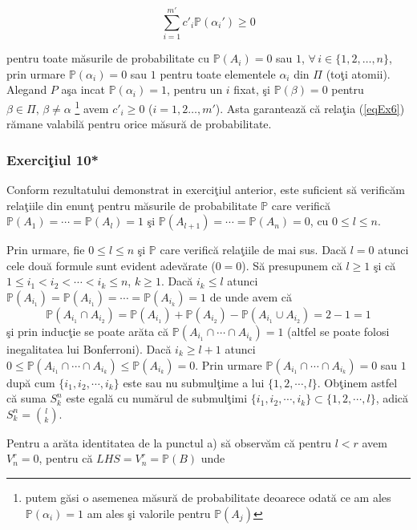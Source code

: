 \documentclass[]{article}
\def\a{{\alpha}}
\def\b{{\beta}}
\def\PP{{\mathbb P}}
\let\rmarkdownfootnote\footnote%
\def\footnote{\protect\rmarkdownfootnote}
\begin{document}
\begin{equation}\label{eqEx6}
  \sum_{i=1}^{m'}c'_{i}\PP(\a_i')\geq 0 
\end{equation}

pentru toate m\u asurile de probabilitate cu \(\PP(A_i)=0\) sau \(1\),
\(\forall\, i\in\{1,2,\dots,n\}\), prin urmare \(\PP(\a_i)=0\) sau \(1\)
pentru toate elementele \(\a_i\) din \(\Pi\) (to\c ti atomii). Alegand
\(P\) a\c sa incat \(\PP(\a_i)=1\), pentru un \(i\) fixat, \c si
\(\PP(\b)=0\) pentru \(\b\in\Pi, \, \b\neq\a\) \footnote{putem g\u asi o
  asemenea m\u asur\u a de probabilitate deoarece odat\u a ce am ales
  \(\PP(\a_i)=1\) am ales \c si valorile pentru \(\PP(A_j)\)} avem
\(c'_i\geq 0\) (\(i=1,2\dots,m'\)). Asta garanteaz\u a c\u a rela\c tia
(\ref{eqEx6}) r\u amane valabil\u a pentru orice m\u asur\u a de
probabilitate.

\subsubsection{\texorpdfstring{Exerci\c tiul
10*}{Exerciiul 10*}}\label{exerciiul-10}

Conform rezultatului demonstrat in exerci\c tiul anterior, este
suficient s\u a verific\u am rela\c tiile din enun\c t pentru
m\u asurile de probabilitate \(\PP\) care verific\u a
\(\PP(A_1)=\cdots=\PP(A_l)=1\) \c si \(\PP(A_{l+1})=\cdots=\PP(A_n)=0\),
cu \(0\leq l\leq n\).

Prin urmare, fie \(0\leq l\leq n\) \c si \(\PP\) care verific\u a
rela\c tiile de mai sus. Dac\u a \(l=0\) atunci cele dou\u a formule
sunt evident adev\u arate (\(0=0\)). S\u a presupunem c\u a \(l\geq1\)
\c si c\u a \(1\leq i_1<i_2<\cdots<i_k\leq n\), \(k\geq 1\). Dac\u a
\(i_k\leq l\) atunci \(\PP(A_{i_1})=\PP(A_{i_1})=\cdots=\PP(A_{i_k})=1\)
de unde avem c\u a \[
  \PP(A_{i_1}\cap A_{i_2})=\PP(A_{i_1})+\PP(A_{i_2})-\PP(A_{i_1}\cup A_{i_2})=2-1=1
\] \c si prin induc\c tie se poate ar\u ata c\u a
\(\PP(A_{i_1}\cap\cdots\cap A_{i_k})=1\) (altfel se poate folosi
inegalitatea lui Bonferroni). Dac\u a \(i_k\geq l+1\) atunci
\(0\leq \PP(A_{i_1}\cap\cdots\cap A_{i_k})\leq \PP(A_{i_k})=0\). Prin
urmare \(\PP(A_{i_1}\cap\cdots\cap A_{i_k})=0\) sau \(1\) dup\u a cum
\(\{i_1,i_2,\cdots,i_k\}\) este sau nu submul\c time a lui
\(\{1,2,\cdots,l\}\). Ob\c tinem astfel c\u a suma \(S_{k}^{n}\) este
egal\u a cu num\u arul de submul\c timi
\(\{i_1,i_2,\cdots,i_k\}\subset\{1,2,\cdots,l\}\), adic\u a
\(S_{k}^{n}=\binom{l}{k}\).

Pentru a ar\u ata identitatea de la punctul a) s\u a observ\u am c\u a
pentru \(l<r\) avem \(V_{n}^{r}=0\), pentru c\u a
\(LHS=V_{n}^{r}=\PP(B)\) unde
\end{document}
